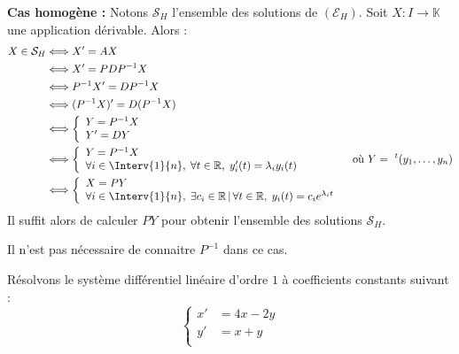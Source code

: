 \documentclass[a4paper,10pt]{report}
\begin{document}
\textbf{Cas homogène :} Notons $\mathcal{S}_H$ l'ensemble des solutions de $(\mathcal{E}_H)$. Soit $X : I \rightarrow \mathbb{K}$ une application dérivable. Alors :
\begin{align*}
X \in \mathcal{S}_H & \Longleftrightarrow  X'=AX \\
& \Longleftrightarrow X'=PDP^{-1} X\\
& \Longleftrightarrow P^{-1}X'=DP^{-1}X \\
& \Longleftrightarrow (P^{-1}X)'=D(P^{-1}X) \\
& \Longleftrightarrow \left\lbrace \begin{array}{l}
Y=P^{-1}X \\
Y'=DY \\
\end{array}\right. \\
& \Longleftrightarrow \left\lbrace \begin{array}{l}
Y=P^{-1}X \\
\forall i \in \Interv{1}{n}, \; \forall t \in  \mathbb{R},  \; y_i'(t)=\lambda_i y_i(t)  \\
\end{array}\right. \qquad \qquad \hbox{ où } Y= ~^t(y_1, \ldots, y_n) \\
& \Longleftrightarrow \left\lbrace \begin{array}{l}
X=PY \\
\forall i \in \Interv{1}{n}, \; \exists c_i \in  \mathbb{R} \, \vert \, \forall t \in \mathbb{R}, \; y_i(t)=c_i e^{\lambda_i t}  \\
\end{array}\right.
\end{align*}
Il suffit alors de calculer $PY$ pour obtenir l'ensemble des solutions $\mathcal{S}_H$.

\begin{Remarque}{} Il n'est pas nécessaire de connaitre $P^{-1}$ dans ce cas.
\end{Remarque}

\begin{Exemple} Résolvons le système différentiel linéaire d'ordre $1$ à coefficients constants suivant : 
$$ \left\lbrace \begin{array}{lll}
    x' & = 4x - 2y \\
    y' & = x + y \\
    \end{array}\right.$$
    
    \vspace{12cm}
\end{Exemple}
\end{document}
